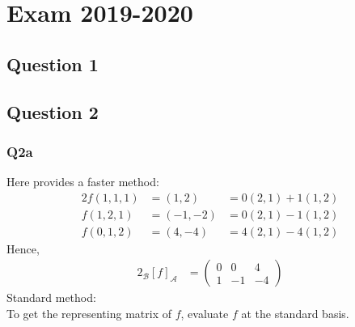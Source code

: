 \section{Exam 2019-2020}

\subsection{Question 1}
\subsection{Question 2}
\subsubsection{Q2a}
Here provides a faster method:\\
\begin{alignat*}{2}
	f(1, 1, 1) & = (1, 2)   & = 0 (2, 1) + 1 (1, 2) \\
	f(1, 2, 1) & = (-1, -2) & = 0 (2, 1) - 1 (1, 2) \\
	f(0, 1, 2) & = (4, -4)  & = 4 (2, 1) - 4 (1, 2)
\end{alignat*}
Hence,
\begin{alignat*}{2}
	{}_\mathcal{B}[f]_{\mathcal{A}} & =
	\begin{pmatrix}
		0 & 0  & 4  \\
		1 & -1 & -4
	\end{pmatrix}
\end{alignat*}
Standard method:\\
To get the representing matrix of $f$, evaluate $f$ at the standard basis.
